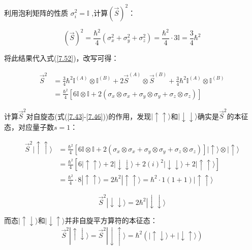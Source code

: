 利用泡利矩阵的性质 \(\sigma_i^2 = \mathbb{I}\) ,计算\(\left(\vec{S}\right)^2\)：

\begin{equation}
	\left(\vec{S}\right)^2 = \frac{\hbar^2}{4}\left(\sigma_x^2 + \sigma_y^2 + \sigma_z^2\right) = \frac{\hbar^2}{4} \cdot 3\mathbb{I} = \frac{3}{4}\hbar^2 \label{7.53}
\end{equation}

将此结果代入式(\ref{7.52})，改写可得：

\begin{equation}
	\begin{aligned}
		\vec{S}^2 &= \frac{3}{4}\hbar^2 \mathbb{I}^{(A)} \otimes \mathbb{I}^{(B)} + 2\vec{S}^{(A)} \otimes \vec{S}^{(B)} + \frac{3}{4}\hbar^2 \mathbb{I}^{(A)} \otimes \mathbb{I}^{(B)} \\
		&= \frac{\hbar^2}{4}\left[6\mathbb{I} \otimes \mathbb{I} + 2\left(\sigma_x \otimes \sigma_x + \sigma_y \otimes \sigma_y + \sigma_z \otimes \sigma_z\right)\right]
	\end{aligned}
\end{equation}

计算\(\vec{S}^2\)对自旋态(式(\ref{7.43}-\ref{7.46}))的作用，发现\(|\uparrow\uparrow\rangle\)和\(|\downarrow\downarrow\rangle\)确实是\(\vec{S}^2\)的本征态，对应量子数\(s=1\)：

\begin{equation}
	\begin{aligned}
		\vec{S}^2|\uparrow\uparrow\rangle &= \frac{\hbar^2}{4}\left[6\mathbb{I} \otimes \mathbb{I} + 2\left(\sigma_x \otimes \sigma_x + \sigma_y \otimes \sigma_y + \sigma_z \otimes \sigma_z\right)\right]|\uparrow\rangle \otimes |\uparrow\rangle \\
		&= \frac{\hbar^2}{4}\left[6|\uparrow\uparrow\rangle + 2|\downarrow\downarrow\rangle + 2(i)^2|\downarrow\downarrow\rangle + 2|\uparrow\uparrow\rangle\right] \\
		&= \frac{\hbar^2}{4} \cdot 8|\uparrow\uparrow\rangle = 2\hbar^2|\uparrow\uparrow\rangle = \hbar^2 \cdot 1(1+1)|\uparrow\uparrow\rangle
	\end{aligned}
\end{equation}

\begin{equation}
	\vec{S}^2|\downarrow\downarrow\rangle = 2\hbar^2|\downarrow\downarrow\rangle \label{7.56}
\end{equation}

而态\(|\uparrow\downarrow\rangle\)和\(|\downarrow\uparrow\rangle\)并非自旋平方算符的本征态：
\begin{equation}
	\vec{S}^2|\uparrow\downarrow\rangle = \vec{S}^2|\downarrow\uparrow\rangle = \hbar^2\left(|\uparrow\downarrow\rangle + |\downarrow\uparrow\rangle\right)
\end{equation}

